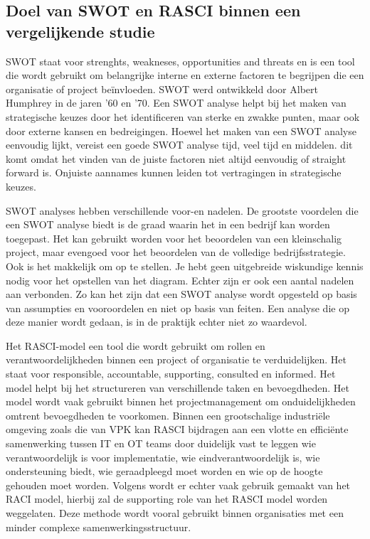 \subsection{Doel van SWOT en RASCI binnen een vergelijkende studie}
SWOT staat voor strenghts, weakneses, opportunities and threats en is een tool die wordt gebruikt om belangrijke interne en externe factoren te begrijpen die een organisatie of project beïnvloeden. SWOT werd ontwikkeld door Albert Humphrey in de jaren '60 en '70. Een SWOT analyse helpt bij het maken van strategische keuzes door het identificeren van sterke en zwakke punten, maar ook door externe kansen en bedreigingen. Hoewel het maken van een SWOT analyse eenvoudig lijkt, vereist een goede SWOT analyse tijd, veel tijd en middelen. dit komt omdat het vinden van de juiste factoren niet altijd eenvoudig of straight forward is. Onjuiste aannames kunnen leiden tot vertragingen in strategische keuzes.\autocite{cipd2025}

\vspace{5mm}
SWOT analyses hebben verschillende voor-en nadelen. De grootste voordelen die een SWOT analyse biedt is de graad waarin het in een bedrijf kan worden toegepast. Het kan gebruikt worden voor het beoordelen van een kleinschalig project, maar evengoed voor het beoordelen van de volledige bedrijfsstrategie. Ook is het makkelijk om op te stellen. Je hebt geen uitgebreide wiskundige kennis nodig voor het opstellen van het diagram. Echter zijn er ook een aantal nadelen aan verbonden. Zo kan het zijn dat een SWOT analyse wordt opgesteld op basis van assumpties en vooroordelen en niet op basis van feiten. Een analyse die op deze manier wordt gedaan, is in de praktijk echter niet zo waardevol. \autocite{sarsby2012}

\vspace{5mm}
Het RASCI-model een tool die wordt gebruikt om rollen en verantwoordelijkheden binnen een project of organisatie te verduidelijken. Het staat voor responsible, accountable, supporting, consulted en informed. Het model helpt bij het structureren van verschillende taken en bevoegdheden. Het model wordt vaak gebruikt binnen het projectmanagement om onduidelijkheden omtrent bevoegdheden te voorkomen. Binnen een grootschalige industriële omgeving zoals die van VPK kan RASCI bijdragen aan een vlotte en efficiënte samenwerking tussen IT en OT teams door duidelijk vast te leggen wie verantwoordelijk is voor implementatie, wie eindverantwoordelijk is, wie ondersteuning biedt, wie geraadpleegd moet worden en wie op de hoogte gehouden moet worden. \autocite{putman2024}
Volgens \autocite{harkhoe2025} wordt er echter vaak gebruik gemaakt van het RACI model, hierbij zal de supporting role van het RASCI model worden weggelaten. Deze methode wordt vooral gebruikt binnen organisaties met een minder complexe samenwerkingsstructuur. 



